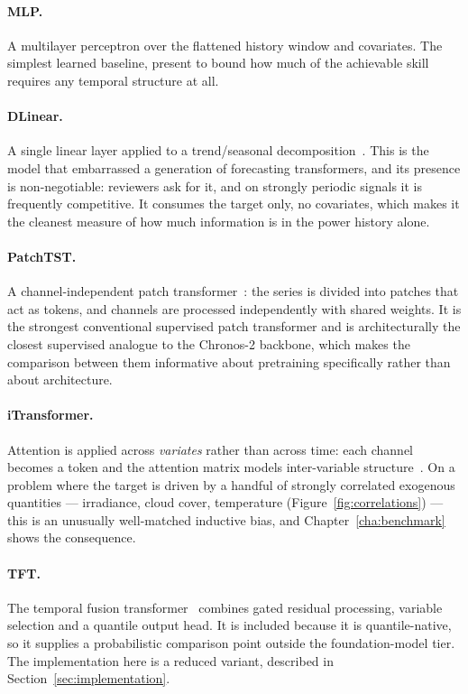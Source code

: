 \paragraph{MLP.} A multilayer perceptron over the flattened history window and covariates.
The simplest learned baseline, present to bound how much of the achievable skill requires
any temporal structure at all.

\paragraph{DLinear.} A single linear layer applied to a trend/seasonal
decomposition~\cite{dlinear}. This is the model that embarrassed a generation of
forecasting transformers, and its presence is non-negotiable: reviewers ask for it, and on
strongly periodic signals it is frequently competitive. It consumes the target only, no
covariates, which makes it the cleanest measure of how much information is in the power
history alone.

\paragraph{PatchTST.} A channel-independent patch transformer~\cite{patchtst}: the series is
divided into patches that act as tokens, and channels are processed independently with
shared weights. It is the strongest conventional supervised patch transformer and is
architecturally the closest supervised analogue to the Chronos-2 backbone, which makes the
comparison between them informative about pretraining specifically rather than about
architecture.

\paragraph{iTransformer.} Attention is applied across \emph{variates} rather than across
time: each channel becomes a token and the attention matrix models inter-variable
structure~\cite{itransformer}. On a problem where the target is driven by a handful of
strongly correlated exogenous quantities --- irradiance, cloud cover, temperature
(Figure~\ref{fig:correlations}) --- this is an unusually well-matched inductive bias, and
Chapter~\ref{cha:benchmark} shows the consequence.

\paragraph{TFT.} The temporal fusion transformer~\cite{tft} combines gated residual
processing, variable selection and a quantile output head. It is included because it is
quantile-native, so it supplies a probabilistic comparison point outside the foundation-model
tier. The implementation here is a reduced variant, described in
Section~\ref{sec:implementation}.

